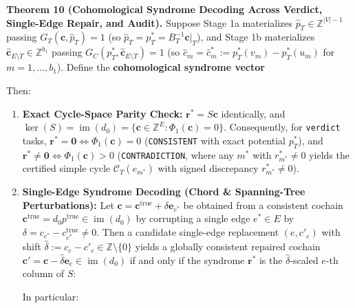\documentclass[
  11pt,
]{article}
\newcommand{\passthrough}[1]{#1}
\providecommand{\tightlist}{%
  \setlength{\itemsep}{0pt}\setlength{\parskip}{0pt}}
\newcommand{\PfpDisplayMath}[1]{%
  \sbox{\PfpMathBox}{$\displaystyle #1$}%
  \ifdim\wd\PfpMathBox>\linewidth
    \resizebox{\linewidth}{!}{\usebox{\PfpMathBox}}%
  \else\usebox{\PfpMathBox}\fi}
\begin{document}
\textbf{Theorem 10 (Cohomological Syndrome Decoding Across Verdict,
Single-Edge Repair, and Audit).} Suppose Stage 1a materializes
\(\hat{p}_T \in \mathbb{Z}^{|V|-1}\) passing
\(G_T(\mathbf{c},\allowbreak  \hat{p}_T) = 1\) (so
\(\hat{p}_T = p_T^* = B_T^{-1} \mathbf{c}|_T\)), and Stage 1b
materializes \(\hat{\mathbf{c}}_{E \setminus T} \in \mathbb{Z}^{b_1}\)
passing \(G_C(p_T^*,\allowbreak  \hat{\mathbf{c}}_{E \setminus T}) = 1\)
(so \(\hat{c}_m = \hat{c}_m^* := p_T^*(v_m) - p_T^*(u_m)\) for
\(m = 1,\allowbreak  \dots,\allowbreak  b_1\)). Define the
\textbf{cohomological syndrome vector}
\begin{center}\PfpDisplayMath{\mathbf{r}^* := \hat{\mathbf{c}}^* - \mathbf{c}|_{E \setminus T} \in \mathbb{Z}^{b_1}.}\end{center}
Then:

\begin{enumerate}
\def\labelenumi{\arabic{enumi}.}
\tightlist
\item
  \textbf{Exact Cycle-Space Parity Check:}
  \(\mathbf{r}^* = S\mathbf{c}\) identically, and
  \(\ker(S) = \operatorname{im}(d_0) = \{\mathbf{c} \in \mathbb{Z}^E : \Phi_1(\mathbf{c}) = 0\}\).
  Consequently, for \passthrough{\lstinline!verdict!} tasks,
  \(\mathbf{r}^* = \mathbf{0} \iff \Phi_1(\mathbf{c}) = 0\)
  (\passthrough{\lstinline!CONSISTENT!} with exact potential \(p_T^*\)),
  and \(\mathbf{r}^* \ne \mathbf{0} \iff \Phi_1(\mathbf{c}) > 0\)
  (\nolinkurl{CONTRADICTION}, where any \(m^*\) with \(r_{m^*}^* \ne 0\)
  yields the certified simple cycle \(\mathcal{C}_T(e_{m^*})\) with
  signed discrepancy \(r_{m^*}^* \ne 0\)).
\item
  \textbf{Single-Edge Syndrome Decoding (Chord \& Spanning-Tree
  Perturbations):} Let
  \(\mathbf{c} = \mathbf{c}^{\text{true}} + \delta \mathbf{e}_{e^*}\) be
  obtained from a consistent cochain
  \(\mathbf{c}^{\text{true}} = d_0 p^{\text{true}} \in \operatorname{im}(d_0)\)
  by corrupting a single edge \(e^* \in E\) by
  \(\delta = c_{e^*} - c^{\text{true}}_{e^*} \ne 0\). Then a candidate
  single-edge replacement \((e,\allowbreak  c'_e)\) with shift
  \(\hat{\delta} := c_e - c'_e \in \mathbb{Z} \setminus \{0\}\) yields a
  globally consistent repaired cochain
  \(\mathbf{c}' = \mathbf{c} - \hat{\delta}\mathbf{e}_e \in \operatorname{im}(d_0)\)
  if and only if the syndrome \(\mathbf{r}^*\) is the
  \(\hat{\delta}\)-scaled \(e\)-th column of \(S\):
  \begin{center}\PfpDisplayMath{\mathbf{r}^* = \hat{\delta}\,S_{\cdot, e}.}\end{center}
  In particular:


\end{enumerate}
\end{document}

